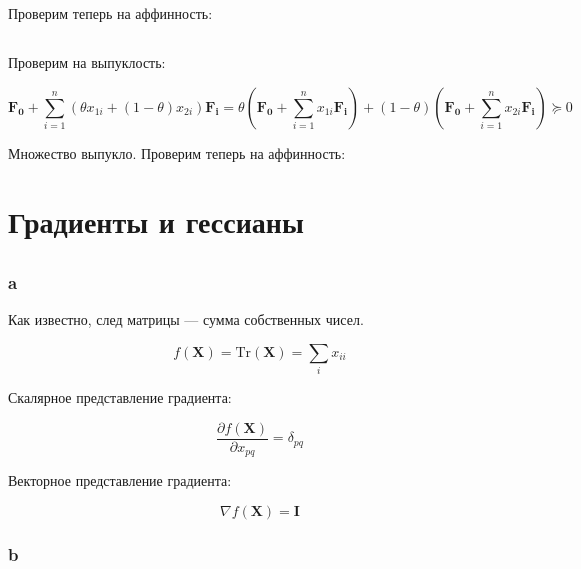 	Проверим теперь на аффинность:
	
	\subsection{}
	
	Проверим на выпуклость:
	
	\begin{equation}
	\mathbf{F_0} + \sum\limits_{i=1}^{n}(\theta x_{1i} + (1-\theta) x_{2i} )\mathbf{F_i} = \theta(\mathbf{F_0} + \sum\limits_{i=1}^{n} x_{1i}\mathbf{F_i}) + (1-\theta)(\mathbf{F_0} + \sum\limits_{i=1}^{n} x_{2i} \mathbf{F_i}) \succeq 0
	\end{equation}
	
	Множество выпукло. Проверим теперь на аффинность:
	
	\section{Градиенты и гессианы}
	
	\subsection{}
	
	\subsubsection{a}
	
	Как известно, след матрицы --- сумма собственных чисел.
	
	\begin{equation}
	f(\mathbf{X}) = \text{Tr} (\mathbf{X}) = \sum_i x_{ii}
	\end{equation}
	
	Скалярное представление градиента:
	
	\begin{equation}
	\frac{\partial f(\mathbf{X}) }{\partial x_{pq}}  = \delta_{pq} 
	\end{equation}
	
	Векторное представление градиента:
	
	\begin{equation}
	\nabla f(\mathbf{X}) = \mathbf{I}
	\end{equation}
	
	\subsubsection{b}
	
